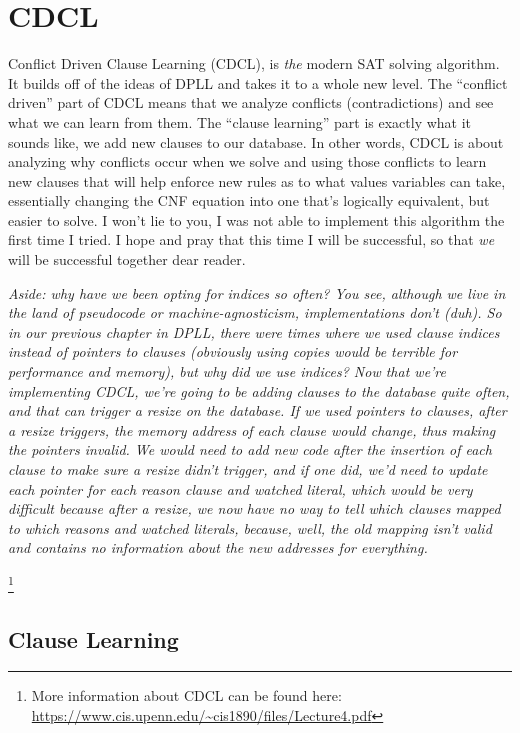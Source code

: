 \documentclass[../main.tex]{subfiles}
\begin{document}
\chapter{CDCL}

Conflict Driven Clause Learning (CDCL), is \textit{the} modern SAT solving 
algorithm. It builds off of the ideas of DPLL and takes it to a whole new level.
The ``conflict driven'' part of CDCL means that we analyze conflicts (contradictions)
and see what we can learn from them. The ``clause learning'' part is exactly what it 
sounds like, we add new clauses to our database. In other words, CDCL is about 
analyzing why conflicts occur when we solve and using those conflicts to learn 
new clauses that will help enforce new rules as to what values variables can take,
essentially changing the CNF equation into one that's logically equivalent, but 
easier to solve. I won't lie to you, I was not able to implement this algorithm the 
first time I tried. I hope and pray that this time I will be successful, so that 
\textit{we} will be successful together dear reader. 

\textit{Aside: why have we been opting for indices so often? You see, although
we live in the land of pseudocode or machine-agnosticism, implementations don't
(duh). So in our previous chapter in DPLL, there were times where we used clause 
indices instead of pointers to clauses (obviously using copies would be terrible 
for performance and memory), but why did we use indices? Now that we're implementing 
CDCL, we're going to be adding clauses to the database quite often, and that can 
trigger a resize on the database. If we used pointers to clauses, after a resize 
triggers, the memory address of each clause would change, thus making the pointers 
invalid. We would need to add new code after the insertion of each clause to make 
sure a resize didn't trigger, and if one did, we'd need to update each pointer for 
each reason clause and watched literal, which would be very difficult because after 
a resize, we now have no way to tell which clauses mapped to which reasons and watched 
literals, because, well, the old mapping isn't valid and contains no information about 
the new addresses for everything.
}

\footnote{More information about CDCL can be found here: 
    \url{https://www.cis.upenn.edu/~cis1890/files/Lecture4.pdf}}
\section{Clause Learning}
\end{document}
